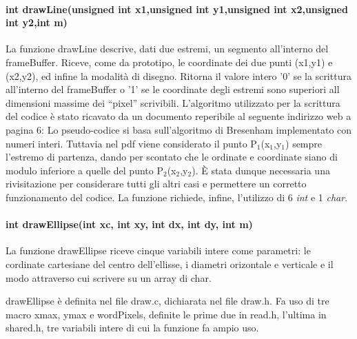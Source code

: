 \documentclass[a4paper]{article}
\begin{document}
		\paragraph{int drawLine(unsigned int x1,unsigned int y1,unsigned int x2,unsigned int y2,int m)}
                La funzione drawLine descrive, dati due estremi, un segmento all'interno del frameBuffer.
                \newline
                Riceve, come da prototipo, le coordinate dei due punti (x1,y1) e (x2,y2), ed infine la modalità di disegno.
                Ritorna il valore intero '0' se la scrittura all'interno del frameBuffer o '1' se le coordinate degli estremi sono superiori all dimensioni massime dei ``pixel'' scrivibili.
                L'algoritmo utilizzato per la scrittura del codice è stato ricavato da un documento reperibile al seguente indirizzo web a pagina 6:\newline
                \href{http://www.idav.ucdavis.edu/education/GraphicsNotes/Bresenhams-Algorithm.pdf}\newline
                Lo pseudo-codice si basa sull'algoritmo di Bresenham implementato con numeri interi.
                Tuttavia nel pdf viene considerato il punto P$_{1}$(x$_{1}$,y$_{1}$) sempre l'estremo di partenza, dando per scontato che le ordinate e coordinate siano di modulo inferiore a quelle del punto P$_{2}$(x$_{2}$,y$_{2}$).
                È stata dunque necessaria una rivisitazione per considerare tutti gli altri casi e permettere un corretto funzionamento del codice.
                La funzione richiede, infine, l'utilizzo di 6 \textit{int} e 1 \textit{char}.
		\paragraph{int drawEllipse(int xc, int xy, int dx, int dy, int m)}
		La funzione drawEllipse riceve cinque variabili intere come parametri:
                le cordinate cartesiane del centro dell'ellisse, i diametri orizontale e verticale e il modo attraverso cui scrivere su un array di char.
		
		drawEllipse è definita nel file draw.c, dichiarata nel file draw.h.
                Fa uso di tre macro xmax, ymax e wordPixels, definite le prime due in read.h, l'ultima in shared.h, tre variabili intere di cui la funzione fa ampio uso.
		
\end{document}
